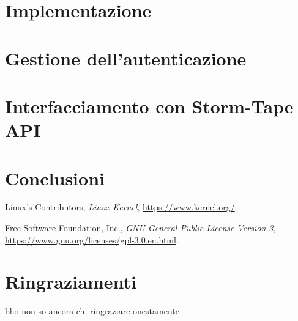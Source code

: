 \documentclass[12pt,a4paper,openright,twoside]{report}
\begin{document}
\chapter{Implementazione}
\lhead[\fancyplain{}{\bfseries\thepage}]{\fancyplain{}{\bfseries\rightmark}}


\chapter{Gestione dell'autenticazione}
\lhead[\fancyplain{}{\bfseries\thepage}]{\fancyplain{}{\bfseries\rightmark}}


\chapter{Interfacciamento con Storm-Tape API}
\lhead[\fancyplain{}{\bfseries\thepage}]{\fancyplain{}{\bfseries\rightmark}}


\chapter{Conclusioni}
\lhead[\fancyplain{}{\bfseries\thepage}]{\fancyplain{}{\bfseries\rightmark}}


\begin{thebibliography}{99}
	Linux's Contributors,
	\textit{Linux Kernel},
	\url{https://www.kernel.org/}.

	Free Software Foundation, Inc.,
	\textit{GNU General Public License Version 3},
	\url{https://www.gnu.org/licenses/gpl-3.0.en.html}.

\end{thebibliography}

\chapter*{Ringraziamenti}
bho non so ancora chi ringraziare onestamente
\end{document}
